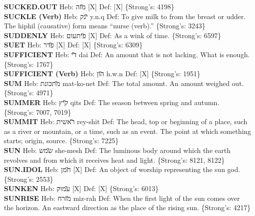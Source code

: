{\textbf{SUCKED.OUT} Heb: {\large\H מזה} {[}X{]} Def: {[}X{]} \{Strong's: 4198\}\hfill{}\\

\textbf{SUCKLE (Verb)} Heb: {\large\H ינק} y.n.q Def: To give milk to from the breast or udder. The hiphil (causative) form means ``nurse (verb).'' \{Strong's: 3243\}\hfill{}\\

\textbf{SUDDENLY} Heb: {\large\H פיתעום} {[}X{]} Def: As a wink of time. \{Strong's: 6597\}\hfill{}\\

\textbf{SUET} Heb: {\large\H פדר} {[}X{]} Def: {[}X{]} \{Strong's: 6309\}\hfill{}\\

\textbf{SUFFICIENT} Heb: {\large\H די} dai Def: An amount that is not lacking. What is enough. \{Strong's: 1767\}\hfill{}\\

\textbf{SUFFICIENT (Verb)} Heb: {\large\H הון} h.w.n Def: {[}X{]} \{Strong's: 1951\}\hfill{}\\

\textbf{SUM} Heb: {\large\H מתכונת} mat-ko-net Def: The total amount. An amount weighed out. \{Strong's: 4971\}\hfill{}\\

\textbf{SUMMER} Heb: {\large\H קיץ} qits Def: The season between spring and autumn. \{Strong's: 7007, 7019\}\hfill{}\\

\textbf{SUMMIT} Heb: {\large\H ראשית} rey-shit Def: The head, top or beginning of a place, such as a river or mountain, or a time, such as an event. The point at which something starts; origin, source. \{Strong's: 7225\}\hfill{}\\

\textbf{SUN} Heb: {\large\H שמש} she-mesh Def: The luminous body around which the earth revolves and from which it receives heat and light. \{Strong's: 8121, 8122\}\hfill{}\\

\textbf{SUN.IDOL} Heb: {\large\H חמן} {[}X{]} Def: An object of worship representing the sun god. \{Strong's: 2553\}\hfill{}\\

\textbf{SUNKEN} Heb: {\large\H עמוק} {[}X{]} Def: {[}X{]} \{Strong's: 6013\}\hfill{}\\

\textbf{SUNRISE} Heb: {\large\H מזרח} miz-rah Def: When the first light of the sun comes over the horizon. An eastward direction as the place of the rising sun. \{Strong's: 4217\}\hfill{}\\

}

